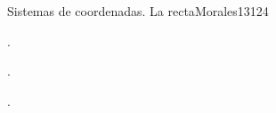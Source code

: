 \begin{syllabus}
\begin{competences}
    \item {}
    \item {}
    \item {}
    \item {}
\end{competences}

\begin{unit}{Sistemas de coordenadas. La recta}{}{Morales13}{12}{4}
   \begin{topics}
      \item .
      \item .
   \end{topics}
   \begin{learningoutcomes}
      \item .
   \end{learningoutcomes}
\end{unit}



\begin{coursebibliography}
\end{coursebibliography}

\end{syllabus}
